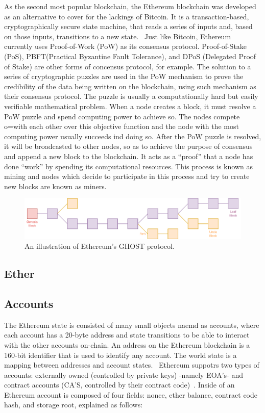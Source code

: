     As the second most popular blockchain, the Ethereum blockchain was developed as an alternative to cover for the lackings of Bitcoin.
    It is a transaction-based, cryptographically secure state machine, that reads a series of inputs and, based on those inputs, transitions to a new state.~\cite{ferreira2022smart}
    Just like Bitcoin, Ethereum currently uses Proof-of-Work (PoW) as its consensus protocol.
    Proof-of-Stake (PoS), PBFT(Practical Byzantine Fault Tolerance), and DPoS (Delegated Proof of Stake) are other forms of concensus protocol, for example.
    The solution to a series of cryptographic puzzles are used in the PoW mechanism to prove the credibility of the data being written on the blockchain, using such mechanism as their consensus protocol.
    The puzzle is usually a computationally hard but easily verifiable mathematical problem.
    When a node creates a block, it must resolve a PoW puzzle and spend computing power to achieve so. The nodes compete o=with each other over this objective function and the node with the most computing power usually succeeds ind doing so.
    After the PoW puzzle is resolved, it will be broadcasted to other nodes, so as to achieve the purpose of consensus and append a new block to the blockchain.
    It acts as a “proof” that a node has done “work” by spending its computational resources.
    This process is known as mining and nodes which decide to participate in this process and try to create new blocks are known as miners.

    \begin{figure}
        \centering
        \includegraphics[width=\textwidth]{figures/uncle.png}
        \caption{An illustration of Ethereum's GHOST protocol.}
        \label{fig:uncle}
    \end{figure}

    \subsection{Ether}


    \subsection{Accounts}
        The Ethereum state is consisted of many small objects naemd as accounts, where each account has a 20-byte address and state transitions to be able to interact with the other accounts on-chain.
        An address on the Ethereum blockchain is a 160-bit identifier that is used to identify any account.
        The world state is a mapping between addresses and account states.~\cite{wood2014ethereum}
        Ethereum suppotrs two types of accounts: externally owned
        (controlled by private keys) -namely EOA's- and contract accounts (CA'S, controlled by their contract code)~\cite{ethereum2014ethereum}.
        Inside of an Ethereum account is composed of four fields: nonce, ether balance, contract code hash, and storage root, explained as follows:

